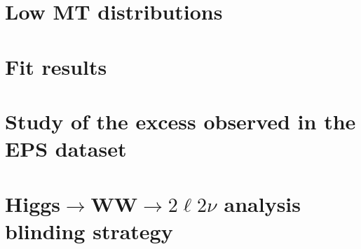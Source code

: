 \documentclass{cmspaper}
\begin{document}
\clearpage
  \section{Low MT distributions}
     \label{app:appendix_lowmt}
 
\clearpage
  \section{Fit results}
     \label{app:appendix_fit}

\clearpage
  \section{Study of the excess observed in the EPS dataset}
     \label{app:limits_eps}

%  
\section{Higgs$\to$WW$\to2\ell2\nu$ analysis blinding strategy}
     \label{app:blinding}
     
\end{document}
